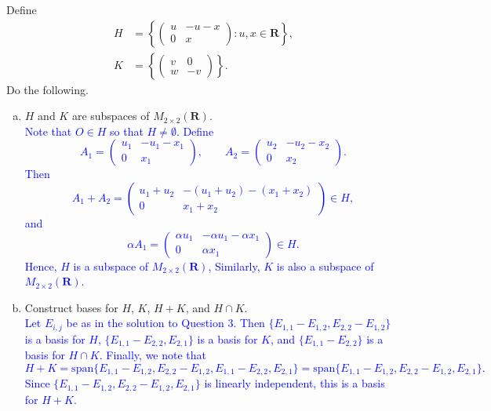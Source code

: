 \documentclass[a4paper,11pt]{article}
\newcommand{\R}{\mathbf{R}}
\newcommand{\BB}[1]{\textcolor{blue}{#1}}
\begin{document}
 Define
\begin{align*}
  H &=
      \left\{
      \begin{pmatrix}
        u & -u-x \\ 0 & x
      \end{pmatrix}
      : u,x \in \R
      \right\}, \\
  K &=
      \left\{
      \begin{pmatrix}
        v & 0 \\ w & -v
      \end{pmatrix}
      \right\}.
\end{align*}
Do the following.
\begin{enumerate}[(a)]
\item $H$ and $K$ are subspaces of $M_{2 \times 2}(\R)$. \\

  \BB{Note that $O \in H$ so that $H \neq \emptyset$. Define
    \[
      A_1 = \begin{pmatrix}
              u_1 & -u_1-x_1 \\
              0 & x_1
            \end{pmatrix}, \qquad
      A_2 = \begin{pmatrix}
              u_2 & -u_2-x_2 \\
              0 & x_2
            \end{pmatrix}.
    \]
    Then
    \[
      A_1+A_2 =
      \begin{pmatrix}
        u_1+u_2 & -(u_1+u_2)-(x_1+x_2) \\
        0 & x_1+x_2
      \end{pmatrix}
      \in H,
    \]
    and
    \[
      \alpha A_1 = \begin{pmatrix}
                     \alpha u_1 & -\alpha u_1-\alpha x_1 \\
                     0 & \alpha x_1
                   \end{pmatrix}
                   \in H.
    \]
    Hence, $H$ is a subspace of $M_{2 \times 2}(\R)$, Similarly, $K$ is also a
    subspace of $M_{2 \times 2}(\R)$. \\}
  
\item Construct bases for $H$, $K$, $H+K$, and $H \cap K$. \\

  \BB{Let $E_{i,j}$ be as in the solution to Question 3. Then
    $\{E_{1,1}-E_{1,2},E_{2,2}-E_{1,2}\}$ is a basis for $H$,
    $\{E_{1,1}-E_{2,2},E_{2,1}\}$ is a basis for $K$, and $\{E_{1,1}-E_{2,2}\}$
    is a basis for $H \cap K$. Finally, we note that
    \[
      H+K=\text{span}\{E_{1,1}-E_{1,2},E_{2,2}-E_{1,2},E_{1,1}-E_{2,2},E_{2,1}\}
      = \text{span}\{E_{1,1}-E_{1,2},E_{2,2}-E_{1,2},E_{2,1}\}.
    \]
    Since $\{E_{1,1}-E_{1,2},E_{2,2}-E_{1,2},E_{2,1}\}$ is linearly independent,
    this is a basis for $H+K$. \\}
\end{enumerate}
\end{document}
